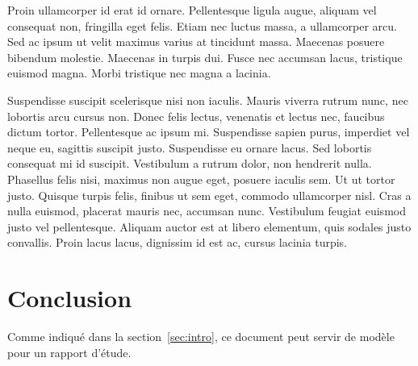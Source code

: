 \documentclass[twoside,openright,a4paper,11pt,french]{article}
\begin{document}
Proin ullamcorper id erat id ornare. Pellentesque ligula augue, aliquam vel consequat non, fringilla eget felis. Etiam nec luctus massa, a ullamcorper arcu. Sed ac ipsum ut velit maximus varius at tincidunt massa. Maecenas posuere bibendum molestie. Maecenas in turpis dui. Fusce nec accumsan lacus, tristique euismod magna. Morbi tristique nec magna a lacinia.

Suspendisse suscipit scelerisque nisi non iaculis. Mauris viverra rutrum nunc, nec lobortis arcu cursus non. Donec felis lectus, venenatis et lectus nec, faucibus dictum tortor. Pellentesque ac ipsum mi. Suspendisse sapien purus, imperdiet vel neque eu, sagittis suscipit justo. Suspendisse eu ornare lacus. Sed lobortis consequat mi id suscipit. Vestibulum a rutrum dolor, non hendrerit nulla. Phasellus felis nisi, maximus non augue eget, posuere iaculis sem. Ut ut tortor justo. Quisque turpis felis, finibus ut sem eget, commodo ullamcorper nisl. Cras a nulla euismod, placerat mauris nec, accumsan nunc. Vestibulum feugiat euismod justo vel pellentesque. Aliquam auctor est at libero elementum, quis sodales justo convallis. Proin lacus lacus, dignissim id est ac, cursus lacinia turpis.

\section{Conclusion}
\label{sec:ccl}
Comme indiqué dans la section~\ref{sec:intro}, ce document peut servir de modèle pour un rapport d'étude.

\cleardoublepage
{}


\end{document}
